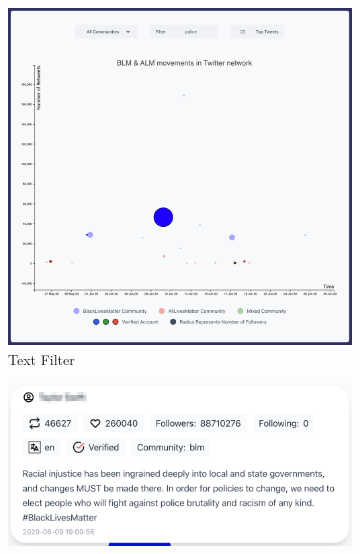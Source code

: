 \begin{figure}[H]

\begin{subfigure}{.5\textwidth}
  \centering
  \captionsetup{justification=centering}
  \includegraphics[width=1\linewidth]{Report-latex/tex_files/pics/example/obserp.png}  
 
  \caption{Text Filter}
  \label{fig:sub-second}
\end{subfigure}
\begin{subfigure}{.5\textwidth}
  \centering
  \captionsetup{justification=centering}
  \includegraphics[width=1\linewidth]{Report-latex/tex_files/pics/example/obserpb1.png}
  
  

\end{subfigure}
\end{figure}
